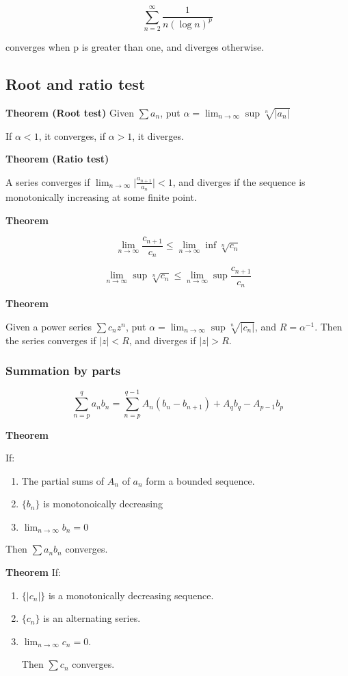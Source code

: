 \documentclass[11pt]{article}
\begin{document}
\[
\sum_{n=2}^\infty  \frac{1}{n (\log n)^p}
\]

converges when p is greater than one, and diverges otherwise.


\subsection{Root and ratio test}
\label{sec:org3e05d57}

\textbf{Theorem (Root test)}
Given \(\sum a_n\), put \(\alpha = \lim_{n\to\infty}\sup\sqrt[n]{|a_n|}\)

If \(\alpha < 1\), it converges, if \(\alpha > 1\), it diverges.

\textbf{Theorem (Ratio test)}

A series converges if \(\lim_{n\to\infty} \vert\frac{a_{n+1}}{a_n}\vert < 1\), and diverges if the sequence is monotonically increasing at some finite point.


\textbf{Theorem}

\[
\lim_{n\to\infty} \frac{c_{n+1}}{c_n} \leq \lim_{n\to\infty} \inf \sqrt[n]{c_n}
\]

\[
\lim_{n\to\infty} \sup \sqrt[n]{c_n} \leq \lim_{n\to\infty} \sup \frac{c_{n+1}}{c_n}
\]

\textbf{Theorem}

Given a power series \(\sum c_n z^n\), put \(\alpha = \lim_{n\to\infty}\sup \sqrt[n]{|c_n|}\), and \(R = \alpha^{-1}\). Then the series converges if \(|z| < R\), and diverges if \(|z| > R\).

\subsubsection{Summation by parts}
\label{sec:orgbd31bfb}

\[
\sum_{n=p}^q a_n b_n = \sum_{n=p}^{q-1} A_n (b_n - b_{n+1}) + A_q b_q - A_{p-1}b_p
\]

\textbf{Theorem}

If:
\begin{enumerate}
\item The partial sums of \(A_n\) of \(a_n\) form a bounded sequence.
\item \(\{b_n\}\) is monotonoically decreasing
\item \(\lim_{n\to\infty}b_n = 0\)
\end{enumerate}

Then \(\sum a_n b_n\) converges.

\textbf{Theorem}
If:
\begin{enumerate}
\item \(\{|c_n|\}\) is a monotonically decreasing sequence.
\item \(\{c_n\}\) is an alternating series.
\item \(\lim_{n\to\infty}c_n = 0\).

Then \(\sum c_n\) converges.
\end{enumerate}
\end{document}
